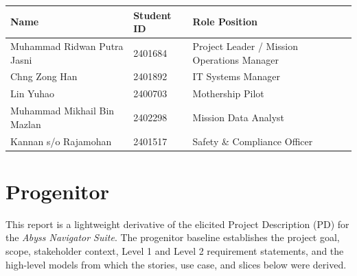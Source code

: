 \documentclass[10pt,a4paper]{article}
\renewcommand{\headrulewidth}{0pt}
\begin{document}
\begin{table}[H]
\centering
\small
\renewcommand{\arraystretch}{1.35}
\begin{tabular}{|P{0.34\textwidth}|P{0.18\textwidth}|P{0.32\textwidth}|}
\hline
{}
\textbf{Name} & \textbf{Student ID} & \textbf{Role Position} \\
\hline
Muhammad Ridwan Putra Jasni & 2401684 & Project Leader / Mission Operations Manager \\
\hline
Chng Zong Han & 2401892 & IT Systems Manager \\
\hline
Lin Yuhao & 2400703 & Mothership Pilot \\
\hline
Muhammad Mikhail Bin Mazlan & 2402298 & Mission Data Analyst \\
\hline
Kannan s/o Rajamohan & 2401517 & Safety \& Compliance Officer \\
\hline
\end{tabular}
\end{table}

\fancyhf{}
\lhead{}
\cfoot{\thepage}
\fancyfootoffset{0pt}
\setlength{\footskip}{68pt}
\renewcommand{\headrulewidth}{0pt}

\newpage

\thispagestyle{empty}
\hypersetup{linkcolor=black}
\tableofcontents
\newpage
\hypersetup{linkcolor=blue}
\setcounter{page}{1}
\hypersetup{pageanchor=true}

\noindent{}

\section{Progenitor}
\label{sec:progenitor}

This report is a lightweight derivative of the elicited Project Description (PD) for the \textit{Abyss Navigator Suite}. The progenitor baseline establishes the project goal, scope, stakeholder context, Level 1 and Level 2 requirement statements, and the high-level models from which the stories, use case, and slices below were derived.
\end{document}
